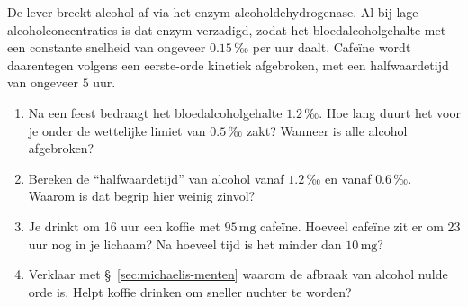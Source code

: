 \begin{oefening}
De lever breekt alcohol af via het enzym alcoholdehydrogenase. Al bij lage alcoholconcentraties is dat enzym verzadigd, zodat het bloedalcoholgehalte met een constante snelheid van ongeveer \(0.15\,\text{‰}\) per uur daalt. Cafeïne wordt daarentegen volgens een eerste-orde kinetiek afgebroken, met een halfwaardetijd van ongeveer \(5\) uur.

\begin{enumerate}
\item[(a)]
  Na een feest bedraagt het bloedalcoholgehalte \(1.2\,\text{‰}\). Hoe lang duurt het voor je onder de wettelijke limiet van \(0.5\,\text{‰}\) zakt? Wanneer is alle alcohol afgebroken?
\item[(b)]
  Bereken de ``halfwaardetijd'' van alcohol vanaf \(1.2\,\text{‰}\) en vanaf \(0.6\,\text{‰}\). Waarom is dat begrip hier weinig zinvol?
\item[(c)]
  Je drinkt om 16 uur een koffie met \(95\,\mathrm{mg}\) cafeïne. Hoeveel cafeïne zit er om 23 uur nog in je lichaam? Na hoeveel tijd is het minder dan \(10\,\mathrm{mg}\)?
\item[(d)]
  Verklaar met \S~\ref{sec:michaelis-menten} waarom de afbraak van alcohol nulde orde is. Helpt koffie drinken om sneller nuchter te worden?
\end{enumerate}
\end{oefening}
